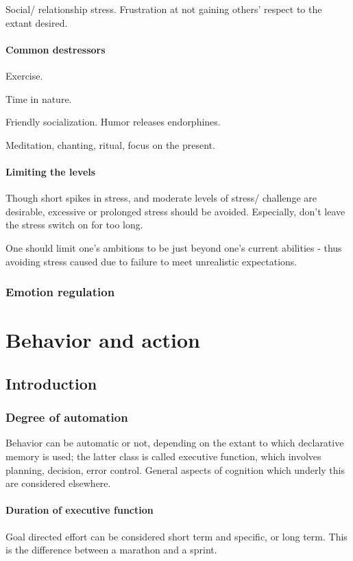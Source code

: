\documentclass[oneside, article]{memoir}
\begin{document}
Social/ relationship stress. Frustration at not gaining others' respect to the extant desired.

\subsection{Common destressors}
Exercise.

Time in nature.

Friendly socialization. Humor releases endorphines.

Meditation, chanting, ritual, focus on the present.

\tbc

\subsection{Limiting the levels}
Though short spikes in stress, and moderate levels of stress/ challenge are desirable, excessive or prolonged stress should be avoided. Especially, don’t leave the stress switch on for too long.

One should limit one's ambitions to be just beyond one's current abilities - thus avoiding stress caused due to failure to meet unrealistic expectations.

\section{Emotion regulation}
\tbc

\part{Behavior and action}
\chapter{Introduction}
\section{Degree of automation}
Behavior can be automatic or not, depending on the extant to which declarative memory is used; the latter class is called executive function, which involves planning, decision, error control. General aspects of cognition which underly this are considered elsewhere.

\subsection{Duration of executive function}
Goal directed effort can be considered short term and specific, or long term. This is the difference between a marathon and a sprint.
\end{document}
